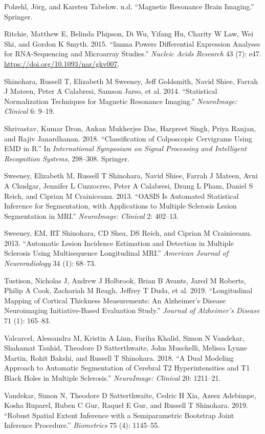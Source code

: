 \documentclass[]{elsarticle} %
\newlength{\cslhangindent}
\newenvironment{cslreferences}%
  {\setlength{\parindent}{0pt}%
  \everypar{\setlength{\hangindent}{\cslhangindent}}\ignorespaces}%
  {\par}
\begin{document}
\begin{cslreferences}
\leavevmode\hypertarget{ref-polzehlmagnetic}{}%
Polzehl, Jörg, and Karsten Tabelow. n.d. ``Magnetic Resonance Brain Imaging.'' Springer.

\leavevmode\hypertarget{ref-limma}{}%
Ritchie, Matthew E, Belinda Phipson, Di Wu, Yifang Hu, Charity W Law, Wei Shi, and Gordon K Smyth. 2015. ``limma Powers Differential Expression Analyses for RNA-Sequencing and Microarray Studies.'' \emph{Nucleic Acids Research} 43 (7): e47. \url{https://doi.org/10.1093/nar/gkv007}.

\leavevmode\hypertarget{ref-shinohara2014statistical}{}%
Shinohara, Russell T, Elizabeth M Sweeney, Jeff Goldsmith, Navid Shiee, Farrah J Mateen, Peter A Calabresi, Samson Jarso, et al. 2014. ``Statistical Normalization Techniques for Magnetic Resonance Imaging.'' \emph{NeuroImage: Clinical} 6: 9--19.

\leavevmode\hypertarget{ref-shrivastav2018classification}{}%
Shrivastav, Kumar Dron, Ankan Mukherjee Das, Harpreet Singh, Priya Ranjan, and Rajiv Janardhanan. 2018. ``Classification of Colposcopic Cervigrams Using EMD in R.'' In \emph{International Symposium on Signal Processing and Intelligent Recognition Systems}, 298--308. Springer.

\leavevmode\hypertarget{ref-sweeney2013oasis}{}%
Sweeney, Elizabeth M, Russell T Shinohara, Navid Shiee, Farrah J Mateen, Avni A Chudgar, Jennifer L Cuzzocreo, Peter A Calabresi, Dzung L Pham, Daniel S Reich, and Ciprian M Crainiceanu. 2013. ``OASIS Is Automated Statistical Inference for Segmentation, with Applications to Multiple Sclerosis Lesion Segmentation in MRI.'' \emph{NeuroImage: Clinical} 2: 402--13.

\leavevmode\hypertarget{ref-sweeney2013automatic}{}%
Sweeney, EM, RT Shinohara, CD Shea, DS Reich, and Ciprian M Crainiceanu. 2013. ``Automatic Lesion Incidence Estimation and Detection in Multiple Sclerosis Using Multisequence Longitudinal MRI.'' \emph{American Journal of Neuroradiology} 34 (1): 68--73.

\leavevmode\hypertarget{ref-tustison2019longitudinal}{}%
Tustison, Nicholas J, Andrew J Holbrook, Brian B Avants, Jared M Roberts, Philip A Cook, Zachariah M Reagh, Jeffrey T Duda, et al. 2019. ``Longitudinal Mapping of Cortical Thickness Measurements: An Alzheimer's Disease Neuroimaging Initiative-Based Evaluation Study.'' \emph{Journal of Alzheimer's Disease} 71 (1): 165--83.

\leavevmode\hypertarget{ref-valcarcel2018dual}{}%
Valcarcel, Alessandra M, Kristin A Linn, Fariha Khalid, Simon N Vandekar, Shahamat Tauhid, Theodore D Satterthwaite, John Muschelli, Melissa Lynne Martin, Rohit Bakshi, and Russell T Shinohara. 2018. ``A Dual Modeling Approach to Automatic Segmentation of Cerebral T2 Hyperintensities and T1 Black Holes in Multiple Sclerosis.'' \emph{NeuroImage: Clinical} 20: 1211--21.

\leavevmode\hypertarget{ref-vandekar2019robust}{}%
Vandekar, Simon N, Theodore D Satterthwaite, Cedric H Xia, Azeez Adebimpe, Kosha Ruparel, Ruben C Gur, Raquel E Gur, and Russell T Shinohara. 2019. ``Robust Spatial Extent Inference with a Semiparametric Bootstrap Joint Inference Procedure.'' \emph{Biometrics} 75 (4): 1145--55.
\end{cslreferences}
\end{document}
